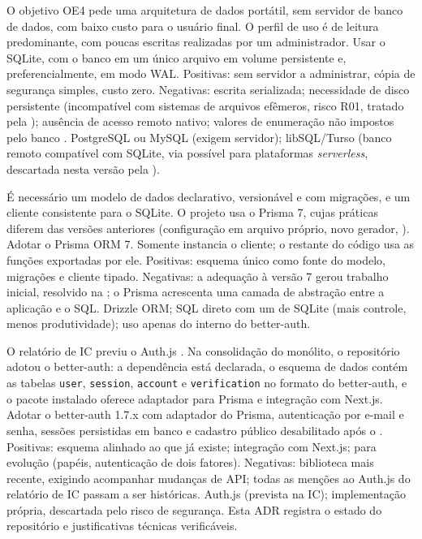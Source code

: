 {O objetivo OE4 pede uma arquitetura de dados portátil, sem servidor de banco de dados, com baixo custo para o usuário final. O perfil de uso é de leitura predominante, com poucas escritas realizadas por um administrador.}
{Usar o SQLite, com o banco em um único arquivo em volume persistente e, preferencialmente, em modo WAL.}
{Positivas: sem servidor a administrar, cópia de segurança simples, custo zero. Negativas: escrita serializada; necessidade de disco persistente (incompatível com sistemas de arquivos efêmeros, risco R01, tratado pela ); ausência de acesso remoto nativo; valores de enumeração não impostos pelo banco \cite{sqliteabout,sqlitewal}.}
{PostgreSQL ou MySQL (exigem servidor); libSQL/Turso (banco remoto compatível com SQLite, via possível para plataformas \emph{serverless}, descartada nesta versão pela ).}

{É necessário um modelo de dados declarativo, versionável e com migrações, e um cliente consistente para o SQLite. O projeto usa o Prisma 7, cujas práticas diferem das versões anteriores (configuração em arquivo próprio, novo gerador, ).}
{Adotar o Prisma ORM 7. Somente  instancia o cliente; o restante do código usa as funções exportadas por ele.}
{Positivas: esquema único como fonte do modelo, migrações e cliente tipado. Negativas: a adequação à versão 7 gerou trabalho inicial, resolvido na ; o Prisma acrescenta uma camada de abstração entre a aplicação e o SQL.}
{Drizzle ORM; SQL direto com um  de SQLite (mais controle, menos produtividade); uso apenas do  interno do better-auth.}

{O relatório de IC previu o Auth.js \cite{reis2026ic}. Na consolidação do monólito, o repositório adotou o better-auth: a dependência está declarada, o esquema de dados contém as tabelas \texttt{user}, \texttt{session}, \texttt{account} e \texttt{verification} no formato do better-auth, e o pacote instalado oferece adaptador para Prisma e integração com Next.js.}
{Adotar o better-auth 1.7.x com adaptador do Prisma, autenticação por e-mail e senha, sessões persistidas em banco e cadastro público desabilitado após o .}
{Positivas: esquema alinhado ao que já existe; integração com Next.js;  para evolução (papéis, autenticação de dois fatores). Negativas: biblioteca mais recente, exigindo acompanhar mudanças de API; todas as menções ao Auth.js do relatório de IC passam a ser históricas.}
{Auth.js (prevista na IC); implementação própria, descartada pelo risco de segurança. Esta ADR registra o estado do repositório e justificativas técnicas verificáveis.}

